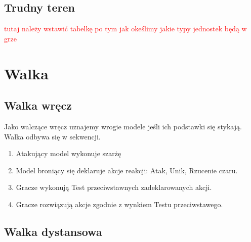 \subsection{Trudny teren}

\textcolor{red}{tutaj należy wstawić tabelkę po tym jak okeślimy jakie typy jednostek będą w grze} 
\section{Walka}
\subsection{Walka wręcz}
Jako walczące wręcz uznajemy wrogie modele jeśli ich podstawki się stykają. Walka odbywa się w sekwencji.
\begin{enumerate}
    \item Atakujący model wykonuje szarżę
    \item Model broniący się deklaruje akcje reakcji: Atak, Unik, Rzucenie czaru. 
    \item Gracze wykonują Test przeciwstawnych zadeklarowanych akcji.
    \item Gracze rozwiązują akcje zgodnie z wynkiem Testu przeciwstawego. 
\end{enumerate}
\subsection{Walka dystansowa}




